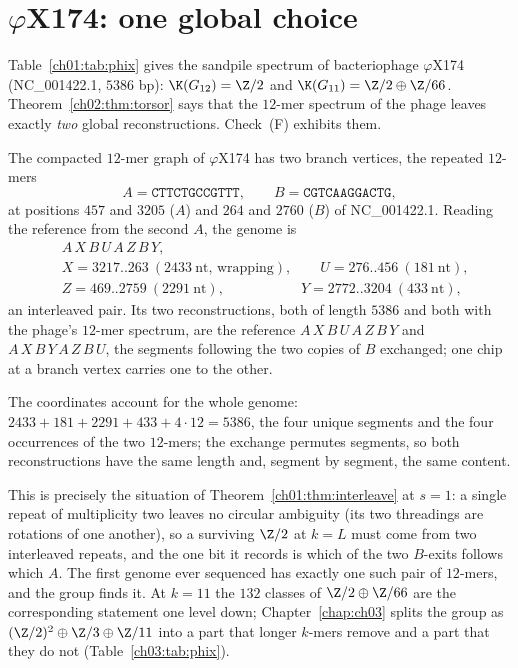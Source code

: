 \section{\texorpdfstring{$\varphi$X174: one global choice}{phiX174: one global choice}}\label{ch02:sec:phix}

Table~\ref{ch01:tab:phix} gives the sandpile spectrum of bacteriophage $\varphi$X174
(NC\_001422.1, $5386$ bp): $\K(G_{12})=\Z/2$ and $\K(G_{11})=\Z/2\oplus\Z/66$. Theorem~\ref{ch02:thm:torsor} says that the $12$-mer spectrum of the phage
leaves exactly \emph{two} global reconstructions. Check~(F) exhibits them.

\begin{proposition}[$\varphi$X174 at $k=12$]\label{ch02:prop:phix}
The compacted $12$-mer graph of $\varphi$X174 has two branch vertices, the repeated
$12$-mers
\[
A=\texttt{CTTCTGCCGTTT},\qquad B=\texttt{CGTCAAGGACTG},
\]
at positions $457$ and $3205$ ($A$) and $264$ and $2760$ ($B$) of NC\_001422.1. Reading
the reference from the second $A$, the genome is
\begin{align*}
&A\,X\,B\,U\,A\,Z\,B\,Y,\\
&X=3217..263\ (2433\ \text{nt, wrapping}),\qquad U=276..456\ (181\ \text{nt}),\\
&Z=469..2759\ (2291\ \text{nt}),\qquad\qquad\quad\ \ Y=2772..3204\ (433\ \text{nt}),
\end{align*}
an interleaved pair. Its two reconstructions, both of length $5386$ and both with the
phage's $12$-mer spectrum, are the reference $A\,X\,B\,U\,A\,Z\,B\,Y$ and
$A\,X\,B\,Y\,A\,Z\,B\,U$, the segments following the two copies of $B$ exchanged; one chip
at a branch vertex carries one to the other.
\end{proposition}

The coordinates account for the whole genome: $2433+181+2291+433+4\cdot12=5386$, the
four unique segments and the four occurrences of the two $12$-mers; the exchange
permutes segments, so both reconstructions have the same length and, segment by segment,
the same content.

This is precisely the situation of Theorem~\ref{ch01:thm:interleave} at $s=1$:
a single repeat of multiplicity two leaves no circular ambiguity (its two threadings are
rotations of one another), so a surviving $\Z/2$ at $k=L$ must come from two interleaved
repeats, and the one bit it records is which of the two $B$-exits follows which $A$. The
first genome ever sequenced has exactly one such pair of $12$-mers, and the group finds it.
At $k=11$ the $132$ classes of $\Z/2\oplus\Z/66$ are the corresponding statement one
level down; Chapter~\ref{chap:ch03} splits the group as $(\Z/2)^{2}\oplus\Z/3\oplus\Z/11$ into a
part that longer $k$-mers remove and a part that they do not (Table~\ref{ch03:tab:phix}).


